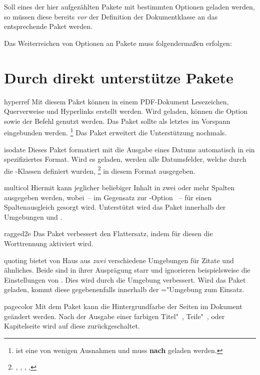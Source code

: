 \documentclass[%
  english,ngerman,%
  headings=optiontoheadandtoc,captions=tableheading,numbers=noenddot,%
  chapterpage,cdfoot,%
]{tudscrman}
\begin{document}
%
Soll eines der hier aufgezählten Pakete mit bestimmten Optionen geladen werden, 
so müssen diese bereits \emph{vor} der Definition der Dokumentklasse an das 
entsprechende Paket werden.
\begin{Example}
Das Weiterreichen von Optionen an Pakete muss folgendermaßen erfolgen:
\end{Example}


\section{Durch \TUDScript direkt unterstütze Pakete}
\begin{packages}
\item[hyperref]
  Mit diesem Paket können in einem PDF-Dokument Lesezeichen, Querverweise und 
  Hyperlinks erstellt werden. Wird  geladen, können die 
  Option  sowie der Befehl  genutzt 
  werden. Das Paket sollte als letztes im Vorspann eingebunden werden.%
  \footnote{%
     ist eine von wenigen Ausnahmen und muss \textbf{nach} 
     geladen werden.
  }
  Das Paket  erweitert die Unterstützung nochmals.
\item[isodate]
  Dieses Paket formatiert mit  die Ausgabe 
  eines Datums automatisch in ein spezifiziertes Format. Wird es geladen, werden 
  alle Datumsfelder, welche durch die \TUDScript-Klassen definiert wurden,%
  \footnote{%
    , , , , 
  }
  in diesem Format ausgegeben.
\item[multicol]
  Hiermit kann jeglicher beliebiger Inhalt in zwei oder mehr Spalten ausgegeben 
  werden, wobei~-- im Gegensatz zur -Option ~-- 
  für einen Spaltenausgleich gesorgt wird. Unterstützt wird das Paket innerhalb 
  der Umgebungen  und .
\item[ragged2e]
  Das Paket verbessert den Flattersatz, indem für diesen die Worttrennung 
  aktiviert wird.
\item[quoting]
   bietet von Haus aus \emph{zwei} verschiedene Umgebungen für 
  Zitate und ähnliches. Beide sind in ihrer Ausprägung starr und ignorieren 
  beispielsweise die Einstellungen von . Dies wird durch die 
  Umgebung  verbessert. Wird das Paket geladen, kommt diese 
  gegebenenfalls innerhalb der ="Umgebung zum Einsatz.
\item[pagecolor]
  Mit dem Paket kann die Hintergrundfarbe der Seiten im Dokument geändert 
  werden. Nach der Ausgabe einer farbigen Titel"~, Teile"~, oder Kapitelseite 
  wird auf diese zurückgeschaltet.
\end{packages}
\end{document}
